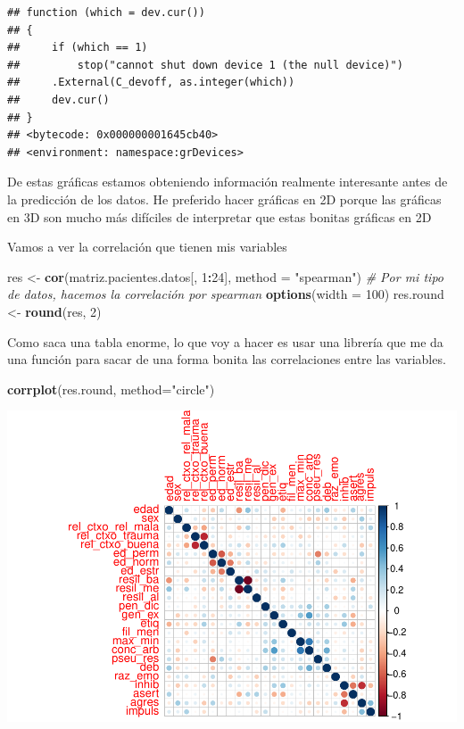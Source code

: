 \documentclass[]{article}
\newenvironment{Shaded}{\begin{snugshade}}{\end{snugshade}}
\newcommand{\CommentTok}[1]{\textcolor[rgb]{0.56,0.35,0.01}{\textit{#1}}}
\newcommand{\DataTypeTok}[1]{\textcolor[rgb]{0.13,0.29,0.53}{#1}}
\newcommand{\DecValTok}[1]{\textcolor[rgb]{0.00,0.00,0.81}{#1}}
\newcommand{\KeywordTok}[1]{\textcolor[rgb]{0.13,0.29,0.53}{\textbf{#1}}}
\newcommand{\NormalTok}[1]{#1}
\newcommand{\OperatorTok}[1]{\textcolor[rgb]{0.81,0.36,0.00}{\textbf{#1}}}
\newcommand{\StringTok}[1]{\textcolor[rgb]{0.31,0.60,0.02}{#1}}
\begin{document}
\begin{verbatim}
## function (which = dev.cur()) 
## {
##     if (which == 1) 
##         stop("cannot shut down device 1 (the null device)")
##     .External(C_devoff, as.integer(which))
##     dev.cur()
## }
## <bytecode: 0x000000001645cb40>
## <environment: namespace:grDevices>
\end{verbatim}

De estas gráficas estamos obteniendo información realmente interesante
antes de la predicción de los datos. He preferido hacer gráficas en 2D
porque las gráficas en 3D son mucho más difíciles de interpretar que
estas bonitas gráficas en 2D

Vamos a ver la correlación que tienen mis variables

\begin{Shaded}
\begin{Highlighting}[]
\NormalTok{res <-}\StringTok{ }\KeywordTok{cor}\NormalTok{(matriz.pacientes.datos[, }\DecValTok{1}\OperatorTok{:}\DecValTok{24}\NormalTok{], }\DataTypeTok{method =} \StringTok{"spearman"}\NormalTok{) }\CommentTok{# Por mi tipo de datos, hacemos la correlación por spearman}
\KeywordTok{options}\NormalTok{(}\DataTypeTok{width =} \DecValTok{100}\NormalTok{)}
\NormalTok{res.round <-}\StringTok{ }\KeywordTok{round}\NormalTok{(res, }\DecValTok{2}\NormalTok{)}
\end{Highlighting}
\end{Shaded}

Como saca una tabla enorme, lo que voy a hacer es usar una librería que
me da una función para sacar de una forma bonita las correlaciones entre
las variables.

\begin{Shaded}
\begin{Highlighting}[]
\KeywordTok{corrplot}\NormalTok{(res.round, }\DataTypeTok{method=}\StringTok{"circle"}\NormalTok{)}
\end{Highlighting}
\end{Shaded}

\includegraphics{codigo_files/figure-latex/grafico_correlaciones_variables-1.pdf}
\end{document}
